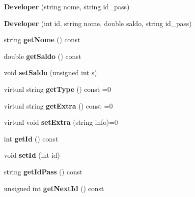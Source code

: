 \begin{DoxyCompactItemize}
\item 
\hypertarget{class_developer_abc9b3e48c4a74a074a9a236a58cd76d4}{{\bfseries Developer} (string nome, string id\+\_\+pass)}\label{class_developer_abc9b3e48c4a74a074a9a236a58cd76d4}

\item 
\hypertarget{class_developer_a6db6c9b58043644f773bd39cf8d0207a}{{\bfseries Developer} (int id, string nome, double saldo, string id\+\_\+pass)}\label{class_developer_a6db6c9b58043644f773bd39cf8d0207a}

\item 
\hypertarget{class_developer_a45a0742f3889353f6d17f1f92cb9060f}{string {\bfseries get\+Nome} () const }\label{class_developer_a45a0742f3889353f6d17f1f92cb9060f}

\item 
\hypertarget{class_developer_a81f51af18ee657401e680deb1fe9f38b}{double {\bfseries get\+Saldo} () const }\label{class_developer_a81f51af18ee657401e680deb1fe9f38b}

\item 
\hypertarget{class_developer_a6d56d8bd26ad1df91a2b29ce87e504e4}{void {\bfseries set\+Saldo} (unsigned int s)}\label{class_developer_a6d56d8bd26ad1df91a2b29ce87e504e4}

\item 
\hypertarget{class_developer_aeb475466479de236692d58dfde6ac191}{virtual string {\bfseries get\+Type} () const =0}\label{class_developer_aeb475466479de236692d58dfde6ac191}

\item 
\hypertarget{class_developer_a38d348d3bb05d3505222bee95c29b2f5}{virtual string {\bfseries get\+Extra} () const =0}\label{class_developer_a38d348d3bb05d3505222bee95c29b2f5}

\item 
\hypertarget{class_developer_affa6ed0c90caf781a20d6fb32940f092}{virtual void {\bfseries set\+Extra} (string info)=0}\label{class_developer_affa6ed0c90caf781a20d6fb32940f092}

\item 
\hypertarget{class_developer_a62488b1ca4ddd82fc0797d3de0123bde}{int {\bfseries get\+Id} () const }\label{class_developer_a62488b1ca4ddd82fc0797d3de0123bde}

\item 
\hypertarget{class_developer_aa84da30abf0b1db518d62825f407c520}{void {\bfseries set\+Id} (int id)}\label{class_developer_aa84da30abf0b1db518d62825f407c520}

\item 
\hypertarget{class_developer_a8e5fdafcd4f78c1ea913e2dc09086caa}{string {\bfseries get\+Id\+Pass} () const }\label{class_developer_a8e5fdafcd4f78c1ea913e2dc09086caa}

\item 
\hypertarget{class_developer_a89801e2863c0548f539beb3077e4f6fc}{unsigned int {\bfseries get\+Next\+Id} () const }\label{class_developer_a89801e2863c0548f539beb3077e4f6fc}

\end{DoxyCompactItemize}
